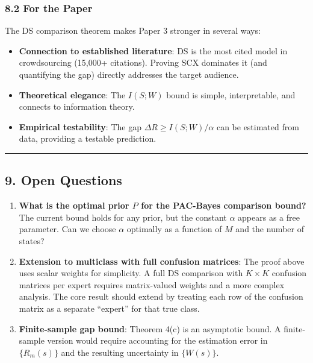 \documentclass[
  12pt,
]{ctexart}
\providecommand{\tightlist}{%
  \setlength{\itemsep}{0pt}\setlength{\parskip}{0pt}}
\begin{document}
\subsubsection{8.2 For the Paper}\label{for-the-paper}

The DS comparison theorem makes Paper 3 stronger in several ways:

\begin{itemize}
\tightlist
\item
  \textbf{Connection to established literature}: DS is the most cited
  model in crowdsourcing (15,000+ citations). Proving SCX dominates it
  (and quantifying the gap) directly addresses the target audience.
\item
  \textbf{Theoretical elegance}: The \(I(S; W)\) bound is simple,
  interpretable, and connects to information theory.
\item
  \textbf{Empirical testability}: The gap
  \(\Delta R \geq I(S; W)/\alpha\) can be estimated from data, providing
  a testable prediction.
\end{itemize}

\begin{center}\rule{0.5\linewidth}{0.5pt}\end{center}

\subsection{9. Open Questions}\label{open-questions}

\begin{enumerate}
\def\labelenumi{\arabic{enumi}.}
\item
  \textbf{What is the optimal prior \(P\) for the PAC-Bayes comparison
  bound?} The current bound holds for any prior, but the constant
  \(\alpha\) appears as a free parameter. Can we choose \(\alpha\)
  optimally as a function of \(M\) and the number of states?
\item
  \textbf{Extension to multiclass with full confusion matrices}: The
  proof above uses scalar weights for simplicity. A full DS comparison
  with \(K \times K\) confusion matrices per expert requires
  matrix-valued weights and a more complex analysis. The core result
  should extend by treating each row of the confusion matrix as a
  separate ``expert'' for that true class.
\item
  \textbf{Finite-sample gap bound}: Theorem 4(c) is an asymptotic bound.
  A finite-sample version would require accounting for the estimation
  error in \(\{R_m(s)\}\) and the resulting uncertainty in \(\{W(s)\}\).
\end{enumerate}
\end{document}

